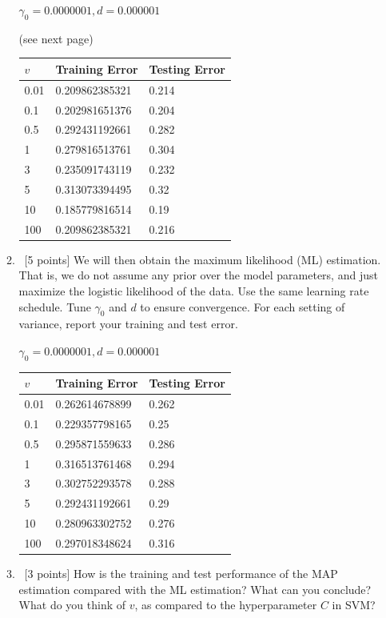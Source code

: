 \documentclass[12pt, fullpage,letterpaper]{article}
\begin{document}
\begin{enumerate}
\begin{enumerate}
		$\gamma_0 = 0.0000001, d = 0.000001$
		
		(see next page)
		\begin{table}[h]
			\begin{tabular}{l||ll}
				$v$ & Training Error & Testing Error \\
				\hline\hline
				0.01 & 0.209862385321 & 0.214 \\
				0.1 & 0.202981651376 & 0.204 \\
				0.5 & 0.292431192661 & 0.282 \\
				1 & 0.279816513761 & 0.304 \\
				3 & 0.235091743119 & 0.232 \\
				5 & 0.313073394495 & 0.32 \\
				10 & 0.185779816514 & 0.19 \\
				100 & 0.209862385321 & 0.216 \\
			\end{tabular}
		\end{table}
		 
		\item~[5 points] We will then obtain the maximum likelihood (ML) estimation. That is, we do not assume any prior over the model parameters, and just maximize the logistic likelihood of the data. Use the same learning rate schedule. Tune $\gamma_0$ and $d$ to ensure convergence. For each setting of variance, report your training and test error. 
		
		$\gamma_0 = 0.0000001, d = 0.000001$
		\begin{table}[h]
			\begin{tabular}{l||ll}
				$v$ & Training Error & Testing Error \\
				\hline\hline
				0.01 & 0.262614678899 & 0.262 \\
				0.1 & 0.229357798165 & 0.25 \\
				0.5 & 0.295871559633 & 0.286 \\
				1 & 0.316513761468 & 0.294 \\
				3 & 0.302752293578 & 0.288 \\
				5 & 0.292431192661 & 0.29 \\
				10 & 0.280963302752 & 0.276 \\
				100 & 0.297018348624 & 0.316 \\
			\end{tabular}
		\end{table}
		
		\item~[3 points] How is the training and test performance of the MAP estimation compared with the ML estimation? What can you conclude? What do you think of $v$, as compared to  the hyperparameter $C$ in SVM?
	\end{enumerate}



\end{enumerate}
\end{document}
